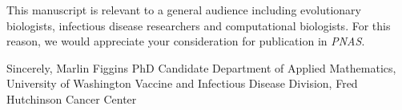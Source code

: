 \documentclass[11pt]{article}
\begin{document}
This manuscript is relevant to a general audience including evolutionary biologists, infectious disease researchers and computational biologists.
For this reason, we would appreciate your consideration for publication in \textit{PNAS}.

\vspace{0.3in} %

Sincerely, \newline
\vspace{0.05in} \newline
Marlin Figgins \newline
PhD Candidate \newline
Department of Applied Mathematics, University of Washington \newline
Vaccine and Infectious Disease Division, Fred Hutchinson Cancer Center
\end{document}
